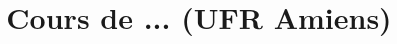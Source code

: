 \documentclass[12pt, a4paper, openany]{book}
\date{}
\title{Cours de ... (UFR Amiens)}
\begin{document}
\maketitle

\chapter{}
\end{document}
